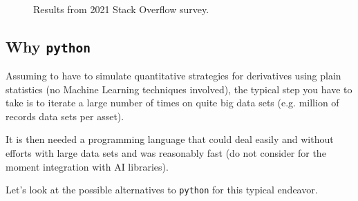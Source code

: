 \begin{figure}[!ht]
\centering
{}\\
\caption{Results from 2021 Stack Overflow survey.}
\label{fig:dummy}
\end{figure}

\subsection{Why \texttt{python}}

Assuming to have to simulate quantitative strategies for derivatives using plain statistics (no Machine Learning techniques involved), the typical step you have to take is to iterate a large number of times on quite big data sets (e.g. million of records data sets per asset).

It is then needed a programming language that could deal easily and without efforts with large data sets and was reasonably fast (do not consider for the moment integration with AI libraries).

Let's look at the possible alternatives to \texttt{python} for this typical endeavor.

